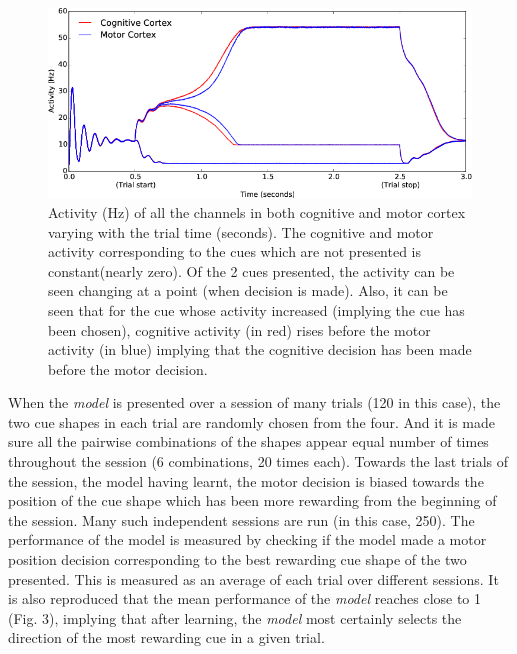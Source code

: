 \documentclass[11pt]{article}
\begin{document}
\begin{figure}[ht]
  \centering
  \includegraphics[width=\textwidth]{figure-1.png}
  \caption[Activity of the channels in both cognitive and motor cortex varying with the trial time]{Activity (Hz) of all the channels in both cognitive and motor cortex varying with the trial time (seconds). The cognitive and motor activity corresponding to the cues which are not presented is constant(nearly zero). Of the 2 cues presented, the activity can be seen changing at a point (when decision is made). Also, it can be seen that for the cue whose activity increased (implying the cue has been chosen), cognitive activity (in red) rises before the motor activity (in blue) implying that the cognitive decision has been made before the motor decision.}
\end{figure}
When the \emph{model} is presented over a session of many trials (120 in this case), the two cue shapes in each trial are randomly chosen from the four. And it is made sure all the pairwise combinations of the shapes appear equal number of times throughout the session (6 combinations, 20 times each). Towards the last trials of the session, the model having learnt, the motor decision is biased towards the position of the cue shape which has been more rewarding from the beginning of the session. Many such independent sessions are run (in this case, 250). The performance of the model is measured by checking if the model made a motor position decision corresponding to the best rewarding cue shape of the two presented. This is measured as an average of each trial over different sessions. It is also reproduced that the mean performance of the \emph{model} reaches close to 1 (Fig. 3), implying that after learning, the \emph{model} most certainly selects the direction of the most rewarding cue in a given trial.
\end{document}
